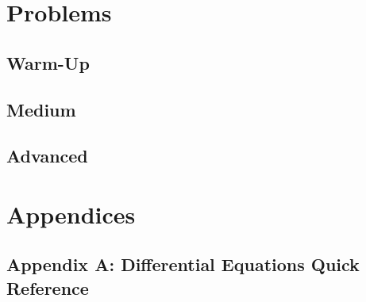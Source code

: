 \documentclass[12pt]{article}
\begin{document}


\newpage
\section{Problems}

\subsection{Warm-Up}


\subsection{Medium}


\subsection{Advanced}


\newpage
\section{Appendices}

\subsection{Appendix A: Differential Equations Quick Reference}

\end{document}
